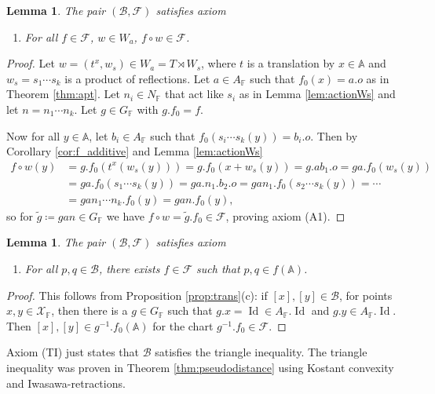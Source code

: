 \documentclass[12pt]{amsart}
\newcommand{\F}{\mathbb{F} }
\newcommand{\X}{\mathcal{X}}
\newcommand{\A}{\mathbb{A}}
\newcommand{\Fun}{\mathscr{F}} %
\newcommand{\B}{\mathcal{B}}
\numberwithin{equation}{section}
\newtheorem{lemma}[theorem]{Lemma}
\theoremstyle{remark} %
\begin{document}
\begin{lemma}\label{lem:A1}
	The pair $(\B,\Fun)$ satisfies axiom
	\begin{enumerate}
		\item [(A1)] For all $f\in \Fun$, $w\in W_a$, $f \circ w \in \Fun$.
	\end{enumerate}
\end{lemma}
\begin{proof} %
	Let  $w= (t^x,w_s) \in W_a = T \rtimes W_s$, where $t$ is a translation by $x\in \A$ and $w_s=s_1 \cdots s_k$ is a product of reflections. Let $a\in A_\F$ such that $f_0(x)=a.o$ as in Theorem \ref{thm:apt}. Let $n_i \in N_\F$ that act like $s_i$ as in Lemma \ref{lem:actionWs} and let $n = n_1 \cdots n_k$. Let $g\in G_\F$ with $g.f_0 = f$.
	
	Now for all $y \in \A$, let $b_i\in A_\F$ such that $f_0(s_i \cdots s_k(y))= b_i.o$. Then by Corollary \ref{cor:f_additive} and Lemma \ref{lem:actionWs}
	\begin{align*}
		f\circ w (y) &= g.f_0(t^x(w_s(y))) 
		= g.f_0(x + w_s(y)) 
		= g.ab_1.o = ga.f_0(w_s(y)) \\
		&= ga.f_0(s_1 \cdots s_k(y)) = ga.n_1.b_2.o = gan_1.f_0(s_2 \cdots s_k(y))
		= \cdots \\
		&= gan_1 \cdots n_k.f_0(y) = gan.f_0(y),
	\end{align*} 
so for $\tilde{g} \coloneqq gan \in G_\F$ we have $f \circ w = \tilde{g}.f_0 \in \Fun$, proving axiom (A1).
\end{proof}
\begin{lemma}\label{lem:A3}
	The pair $(\B,\Fun)$ satisfies axiom 
	\begin{enumerate}
		\item [(A3)] For all $p,q\in \B$, there exists $f\in \Fun$ such that $p,q\in f(\A)$.
	\end{enumerate}
\end{lemma}
\begin{proof}
	This follows from Proposition \ref{prop:trans}(c): if $[x],[y]\in \B$, for points $x,y \in \X_\F$, then there is a $g \in G_\F$ such that $g.x = \operatorname{Id} \in A_\F.\operatorname{Id} $ and $g.y \in A_\F.\operatorname{Id}$. Then $[x],[y] \in g^{-1}.f_0(\A)$ for the chart $g^{-1}.f_0 \in \Fun$.
\end{proof}

Axiom (TI) just states that $\B$ satisfies the triangle inequality. The triangle inequality was proven in Theorem \ref{thm:pseudodistance} using Kostant convexity and Iwasawa-retractions.
\end{document}
